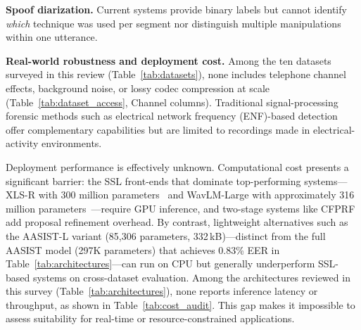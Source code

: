 \documentclass[journal]{IEEEtran}
\begin{document}
\textbf{Spoof diarization.} Current systems provide binary labels but cannot identify \emph{which} technique was used per segment nor distinguish multiple manipulations within one utterance.

\textbf{Real-world robustness and deployment cost.} Among the ten datasets surveyed in this review (Table~\ref{tab:datasets}), none includes telephone channel effects, background noise, or lossy codec compression at scale (Table~\ref{tab:dataset_access}, Channel columns). Traditional signal-processing forensic methods such as electrical network frequency (ENF)-based detection~\cite{zhao2024atd,wang2022enfdeep} offer complementary capabilities but are limited to recordings made in electrical-activity environments.


Deployment performance is effectively unknown. Computational cost presents a significant barrier: the SSL front-ends that dominate top-performing systems---XLS-R with 300 million parameters~\cite{babu2022xlsr} and WavLM-Large with approximately 316 million parameters~\cite{chen2022wavlm}---require GPU inference, and two-stage systems like CFPRF add proposal refinement overhead. By contrast, lightweight alternatives such as the AASIST-L variant (85,306 parameters, 332\,kB)---distinct from the full AASIST model (297K parameters) that achieves 0.83\% EER in Table~\ref{tab:architectures}---can run on CPU but generally underperform SSL-based systems on cross-dataset evaluation. Among the architectures reviewed in this survey (Table~\ref{tab:architectures}), none reports inference latency or throughput, as shown in Table~\ref{tab:cost_audit}. This gap makes it impossible to assess suitability for real-time or resource-constrained applications.
\end{document}
